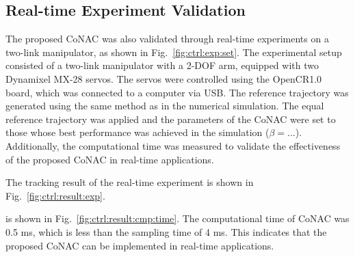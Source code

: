 \documentclass[final,5p,times,twocolumn,authoryear]{elsarticle}
\begin{document}
\subsection{Real-time Experiment Validation}

The proposed CoNAC was also validated through real-time experiments on a two-link manipulator, as shown in Fig.~\ref{fig:ctrl:exp:set}. 
\color{red}
The experimental setup consisted of a two-link manipulator with a 2-DOF arm, equipped with two Dynamixel MX-28 servos. The servos were controlled using the OpenCR1.0 board, which was connected to a computer via USB. The reference trajectory was generated using the same method as in the numerical simulation.
\color{black}
The equal reference trajectory was applied and the parameters of the CoNAC were set to those whose best performance was achieved in the simulation (\ie $\beta=...$).
Additionally, the computational time was measured to validate the effectiveness of the proposed CoNAC in real-time applications.

The tracking result of the real-time experiment is shown in Fig.~\ref{fig:ctrl:result:exp}.

is shown in Fig.~\ref{fig:ctrl:result:cmp:time}. The computational time of CoNAC was 0.5 ms, which is less than the sampling time of 4 ms. 
This indicates that the proposed CoNAC can be implemented in real-time applications.
\end{document}
